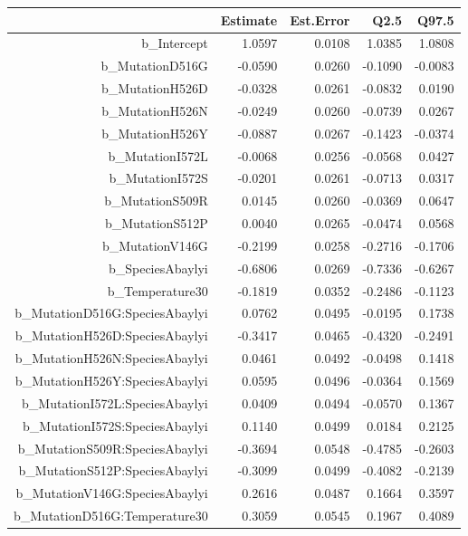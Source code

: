 \begin{table}[ht]
\centering
\begingroup\footnotesize
\begin{tabular}{rrrrr}
  \hline
 & Estimate & Est.Error & Q2.5 & Q97.5 \\ 
  \hline
b\_Intercept & 1.0597 & 0.0108 & 1.0385 & 1.0808 \\ 
  b\_MutationD516G & -0.0590 & 0.0260 & -0.1090 & -0.0083 \\ 
  b\_MutationH526D & -0.0328 & 0.0261 & -0.0832 & 0.0190 \\ 
  b\_MutationH526N & -0.0249 & 0.0260 & -0.0739 & 0.0267 \\ 
  b\_MutationH526Y & -0.0887 & 0.0267 & -0.1423 & -0.0374 \\ 
  b\_MutationI572L & -0.0068 & 0.0256 & -0.0568 & 0.0427 \\ 
  b\_MutationI572S & -0.0201 & 0.0261 & -0.0713 & 0.0317 \\ 
  b\_MutationS509R & 0.0145 & 0.0260 & -0.0369 & 0.0647 \\ 
  b\_MutationS512P & 0.0040 & 0.0265 & -0.0474 & 0.0568 \\ 
  b\_MutationV146G & -0.2199 & 0.0258 & -0.2716 & -0.1706 \\ 
  b\_SpeciesAbaylyi & -0.6806 & 0.0269 & -0.7336 & -0.6267 \\ 
  b\_Temperature30 & -0.1819 & 0.0352 & -0.2486 & -0.1123 \\ 
  b\_MutationD516G:SpeciesAbaylyi & 0.0762 & 0.0495 & -0.0195 & 0.1738 \\ 
  b\_MutationH526D:SpeciesAbaylyi & -0.3417 & 0.0465 & -0.4320 & -0.2491 \\ 
  b\_MutationH526N:SpeciesAbaylyi & 0.0461 & 0.0492 & -0.0498 & 0.1418 \\ 
  b\_MutationH526Y:SpeciesAbaylyi & 0.0595 & 0.0496 & -0.0364 & 0.1569 \\ 
  b\_MutationI572L:SpeciesAbaylyi & 0.0409 & 0.0494 & -0.0570 & 0.1367 \\ 
  b\_MutationI572S:SpeciesAbaylyi & 0.1140 & 0.0499 & 0.0184 & 0.2125 \\ 
  b\_MutationS509R:SpeciesAbaylyi & -0.3694 & 0.0548 & -0.4785 & -0.2603 \\ 
  b\_MutationS512P:SpeciesAbaylyi & -0.3099 & 0.0499 & -0.4082 & -0.2139 \\ 
  b\_MutationV146G:SpeciesAbaylyi & 0.2616 & 0.0487 & 0.1664 & 0.3597 \\ 
  b\_MutationD516G:Temperature30 & 0.3059 & 0.0545 & 0.1967 & 0.4089 \\ 

\end{tabular}
\end{table}
